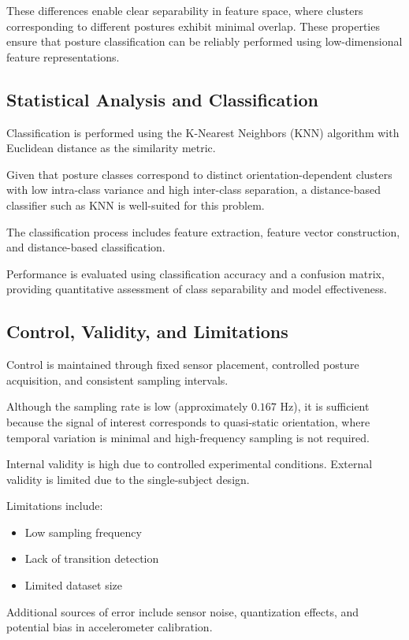 \documentclass[conference]{IEEEtran}
\begin{document}
These differences enable clear separability in feature space, where clusters corresponding to different postures exhibit minimal overlap. These properties ensure that posture classification can be reliably performed using low-dimensional feature representations.

\subsection{Statistical Analysis and Classification}

Classification is performed using the K-Nearest Neighbors (KNN) algorithm with Euclidean distance as the similarity metric.

Given that posture classes correspond to distinct orientation-dependent clusters with low intra-class variance and high inter-class separation, a distance-based classifier such as KNN is well-suited for this problem.

The classification process includes feature extraction, feature vector construction, and distance-based classification.

Performance is evaluated using classification accuracy and a confusion matrix, providing quantitative assessment of class separability and model effectiveness.

\subsection{Control, Validity, and Limitations}

Control is maintained through fixed sensor placement, controlled posture acquisition, and consistent sampling intervals.

Although the sampling rate is low (approximately $0.167$ Hz), it is sufficient because the signal of interest corresponds to quasi-static orientation, where temporal variation is minimal and high-frequency sampling is not required.

Internal validity is high due to controlled experimental conditions. External validity is limited due to the single-subject design.

Limitations include:
\begin{itemize}
    \item Low sampling frequency
    \item Lack of transition detection
    \item Limited dataset size
\end{itemize}

Additional sources of error include sensor noise, quantization effects, and potential bias in accelerometer calibration.
\end{document}

